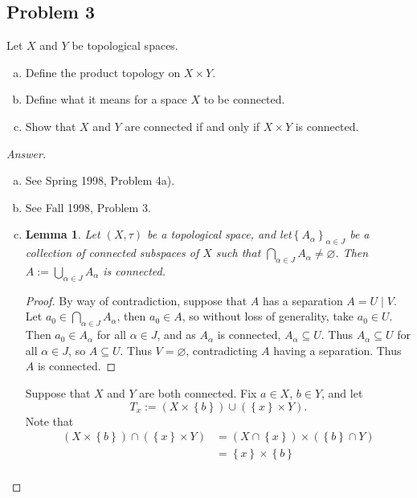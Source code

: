 \documentclass[12pt]{article}
\newcommand\paren[1]{\left( #1 \right)}
\newcommand\setb[1]{\left \{ #1 \right \}}
\newtheorem{lemma}[theorem]{Lemma}
\theoremstyle{definition}
\begin{document}
\subsection{Problem 3 \texorpdfstring{\cite{Munkres,Blair}}{}}
Let $X$ and $Y$ be topological spaces.
\begin{enumerate}[(a)]
    \item Define the product topology on $X \times Y$.
    \item Define what it means for a space $X$ to be connected.
    \item Show that $X$ and $Y$ are connected if and only if $X \times Y$ is connected.
\end{enumerate}
\begin{proof}[Answer]
    \noindent
    \begin{enumerate}[(a)]
        \item See Spring 1998, Problem 4a).
        \item See Fall 1998, Problem 3.
        \item 
        \begin{lemma}
            Let $(X,\tau)$ be a topological space, and let$\setb{ A_{\alpha} }_{\alpha \in J}$ be a collection of connected subspaces of $X$ such that $\bigcap\limits_{\alpha \in J} A_{\alpha} \neq \varnothing$. Then $A := \bigcup\limits_{\alpha \in J} A_{\alpha}$ is connected.
        \end{lemma}
        \begin{proof}
            By way of contradiction, suppose that $A$ has a separation $A = U \mid V$. Let $a_0 \in \bigcap\limits_{\alpha \in J} A_{\alpha}$, then $a_0 \in A$, so without loss of generality, take $a_0 \in U$. Then $a_0 \in A_{\alpha}$ for all $\alpha \in J$, and as $A_{\alpha}$ is connected, $A_{\alpha} \subseteq U$. Thus $A_{\alpha} \subseteq U$ for all $\alpha \in J$, so $A \subseteq U$. Thus $V = \varnothing$, contradicting $A$ having a separation. Thus $A$ is connected.
        \end{proof}
        Suppose that $X$ and $Y$ are both connected. Fix $a \in X$, $b \in Y$, and let 
        \[
            T_x := \paren{ X \times \setb{ b } } \cup \paren{ \setb{ x } \times Y }.
        \]
        Note that 
        \begin{align*}
            \paren{ X \times \setb{ b } } \cap \paren{ \setb{ x } \times Y } & = \paren{ X \cap \setb{ x } } \times \paren{ \setb{ b } \cap Y } \\
            & = \setb{ x } \times \setb{ b } \\

\end{align*}
\end{enumerate}
\end{proof}
\end{document}
